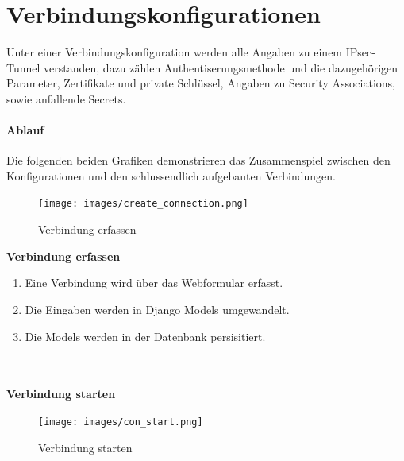 \newpage
\section{Verbindungskonfigurationen}
Unter einer Verbindungskonfiguration werden alle Angaben zu einem IPsec-Tunnel verstanden, dazu zählen Authentiserungsmethode und die dazugehörigen Parameter, Zertifikate und private Schlüssel, Angaben zu  Security Associations, sowie anfallende Secrets.

\paragraph{Ablauf} Die folgenden beiden Grafiken demonstrieren das Zusammenspiel zwischen den Konfigurationen und den schlussendlich aufgebauten Verbindungen. 

\noindent\begin{minipage}[t]{0.4\textwidth}
\vspace{0pt}
    \begin{figure}[H]
    	\centering
    	\texttt{[image: images/create\_connection.png]}
    	\caption{Verbindung erfassen}
    \end{figure}
\end{minipage}
\hfill
\noindent\begin{minipage}[t]{0.6\textwidth}
\vspace{0pt}
\textbf{Verbindung erfassen}\
    \begin{enumerate}
        \item Eine Verbindung wird über das Webformular erfasst.
        \item Die Eingaben werden in Django Models umgewandelt.
        \item Die Models werden in der Datenbank persisitiert.
    \end{enumerate}
\end{minipage}
\hfill
\mbox{}\\\\
\textbf{Verbindung starten}\\
    \begin{figure}[H]
    	\centering
    	\texttt{[image: images/con\_start.png]}
    	\caption{Verbindung starten}
    \end{figure}
